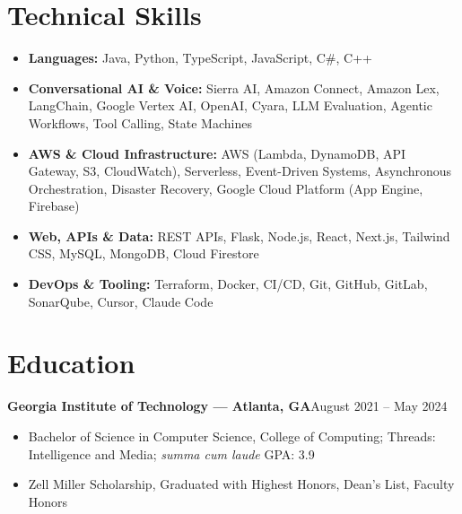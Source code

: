 \documentclass[10pt]{article}
\begin{document}
\section{Technical Skills}
\begin{itemize}[leftmargin=0pt, label={}, itemsep=0.6pt]
  \item \textbf{Languages:} Java, Python, TypeScript, JavaScript, C\#, C++
  \item \textbf{Conversational AI \& Voice:} Sierra AI, Amazon Connect, Amazon Lex, LangChain, Google Vertex AI, OpenAI, Cyara, LLM Evaluation, Agentic Workflows, Tool Calling, State Machines
  \item \textbf{AWS \& Cloud Infrastructure:} AWS (Lambda, DynamoDB, API Gateway, S3, CloudWatch), Serverless, Event-Driven Systems, Asynchronous Orchestration, Disaster Recovery, Google Cloud Platform (App Engine, Firebase)
  \item \textbf{Web, APIs \& Data:} REST APIs, Flask, Node.js, React, Next.js, Tailwind CSS, MySQL, MongoDB, Cloud Firestore
  \item \textbf{DevOps \& Tooling:} Terraform, Docker, CI/CD, Git, GitHub, GitLab, SonarQube, Cursor, Claude Code
\end{itemize}

\section{Education}
\noindent\textbf{Georgia Institute of Technology — Atlanta, GA}\hfill August 2021 -- May 2024\par
\begin{itemize}
  \item Bachelor of Science in Computer Science, College of Computing; Threads: Intelligence and Media; \textit{summa cum laude} \hfill GPA: 3.9
  \item Zell Miller Scholarship, Graduated with Highest Honors, Dean's List, Faculty Honors
\end{itemize}
\end{document}
